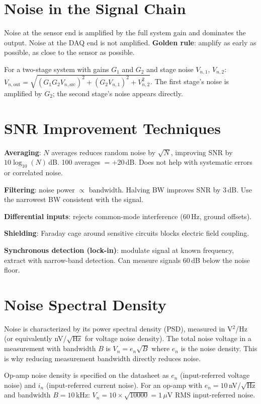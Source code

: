 \documentclass[11pt,letterpaper,twoside,openany]{book}
\begin{document}
\section{Noise in the Signal Chain}
Noise at the sensor end is amplified by the full system gain and dominates the output. Noise at the DAQ end is not amplified. \textbf{Golden rule}: amplify as early as possible, as close to the sensor as possible.

For a two-stage system with gains $G_1$ and $G_2$ and stage noise $V_{n,1}$, $V_{n,2}$: $V_{n,\text{out}} = \sqrt{(G_1 G_2 V_{n,\text{src}})^2 + (G_2 V_{n,1})^2 + V_{n,2}^2}$. The first stage's noise is amplified by $G_2$; the second stage's noise appears directly.

\section{SNR Improvement Techniques}
\textbf{Averaging}: $N$ averages reduces random noise by $\sqrt{N}$, improving SNR by $10\log_{10}(N)$\,dB. 100 averages $= +$20\,dB. Does not help with systematic errors or correlated noise.

\textbf{Filtering}: noise power $\propto$ bandwidth. Halving BW improves SNR by 3\,dB. Use the narrowest BW consistent with the signal.

\textbf{Differential inputs}: rejects common-mode interference (60\,Hz, ground offsets).

\textbf{Shielding}: Faraday cage around sensitive circuits blocks electric field coupling.

\textbf{Synchronous detection (lock-in)}: modulate signal at known frequency, extract with narrow-band detection. Can measure signals 60\,dB below the noise floor.


\section{Noise Spectral Density}
Noise is characterized by its power spectral density (PSD), measured in V$^2$/Hz (or equivalently nV/$\sqrt{\text{Hz}}$ for voltage noise density). The total noise voltage in a measurement with bandwidth $B$ is $V_n = e_n \sqrt{B}$ where $e_n$ is the noise density. This is why reducing measurement bandwidth directly reduces noise.

Op-amp noise density is specified on the datasheet as $e_n$ (input-referred voltage noise) and $i_n$ (input-referred current noise). For an op-amp with $e_n = 10$\,nV/$\sqrt{\text{Hz}}$ and bandwidth $B = 10$\,kHz: $V_n = 10 \times \sqrt{10000} = 1$\,$\mu$V RMS input-referred noise.
\end{document}
